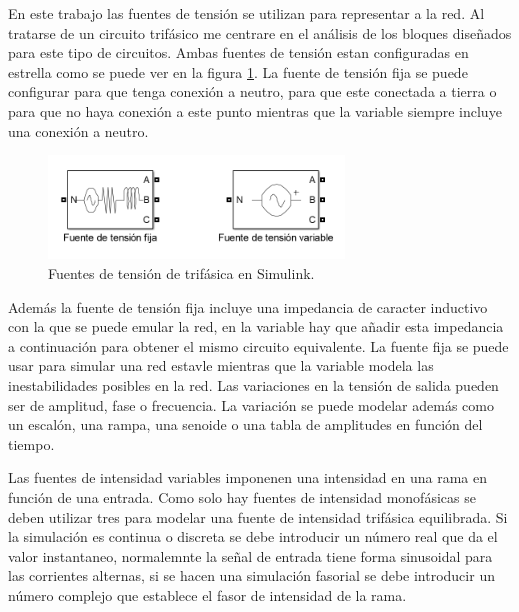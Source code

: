 \documentclass{book}
\begin{document}
En este trabajo las fuentes de tensi\'on se utilizan para representar a la red. Al tratarse de un circuito trif\'asico me centrare en el an\'alisis de los bloques diseñados para este tipo de circuitos. Ambas fuentes de tensi\'on estan configuradas en estrella como se puede ver en la figura \ref{VoltageSources}. La fuente de tensi\'on fija se puede configurar para que tenga conexi\'on a neutro, para que este conectada a tierra o para que no haya conexi\'on a este punto mientras que la variable siempre incluye una conexi\'on a neutro. \par

\begin{figure}[h!]
\centering
\includegraphics[width=0.7\textwidth]{VoltageSources.PNG}
\caption{Fuentes de tensi\'on de trif\'asica en Simulink. }
\label{VoltageSources}
\end{figure} \par

Adem\'as la fuente de tensi\'on fija incluye una impedancia de caracter inductivo con la que se puede emular la red, en la variable hay que añadir esta impedancia a continuaci\'on para obtener el mismo circuito equivalente. La fuente fija se puede usar para simular una red estavle mientras que la variable modela las inestabilidades posibles en la red. Las variaciones en la tensi\'on de salida pueden ser de amplitud, fase o frecuencia. La variaci\'on se puede modelar adem\'as como un escal\'on, una rampa, una senoide o una tabla de amplitudes en funci\'on del tiempo. \par

Las fuentes de intensidad variables imponenen una intensidad en una rama en funci\'on de una entrada. Como solo hay fuentes de intensidad monof\'asicas se deben utilizar tres para modelar una fuente de intensidad trif\'asica equilibrada. Si la simulaci\'on es continua o discreta se debe introducir un n\'umero real que da el valor instantaneo, normalemnte la señal de entrada tiene forma sinusoidal para las corrientes alternas, si se hacen una simulaci\'on fasorial se debe introducir un n\'umero complejo que establece el fasor de intensidad de la rama. \par
\end{document}

